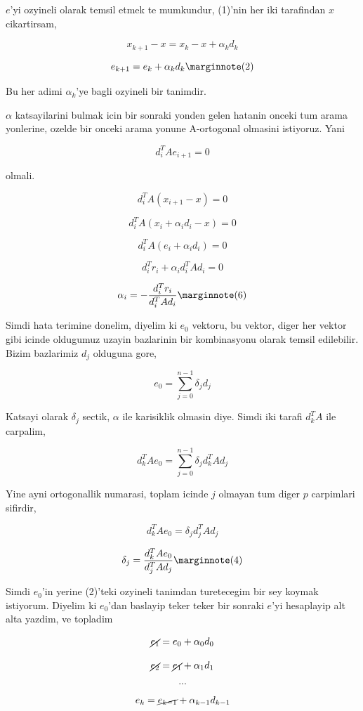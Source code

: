 \documentclass[12pt,fleqn]{article}\usepackage{../common}
\begin{document}
$e$'yi ozyineli olarak temsil etmek te mumkundur, (1)'nin her iki
tarafindan $x$ cikartirsam, 

\[ x_{k+1} - x = x_k - x + \alpha_k d_{k} \]

\[ e_{k+1} = e_k + \alpha_k d_k 
\mlabel{2}
\]

Bu her adimi $\alpha_k$'ye bagli ozyineli bir tanimdir. 

$\alpha$ katsayilarini bulmak icin bir sonraki yonden gelen hatanin onceki
tum arama yonlerine, ozelde bir onceki arama yonune A-ortogonal
olmasini istiyoruz. Yani

\[ d_i^TA e_{i+1}  = 0\]

olmali. 

\[ d_i^TA (x_{i+1}-x)  = 0\]

\[ d_i^TA (x_{i} + \alpha_i d_i -x)  = 0\]

\[ d_i^TA (e_i + \alpha_i d_i )  = 0\]

\[ d_i^Tr_i + \alpha_i d_i^TA d_i   = 0\]

\[ \alpha_i = -\frac{ d_i^Tr_i}{d_i^T A d_i} \mlabel{6}
\]

Simdi hata terimine donelim, diyelim ki $e_0$ vektoru, bu vektor, diger
her vektor gibi icinde oldugumuz uzayin bazlarinin bir kombinasyonu olarak
temsil edilebilir. Bizim bazlarimiz $d_j$ olduguna gore, 

\[ e_0 = \sum _{ j=0}^{n-1} \delta_j d_j \]

Katsayi olarak $\delta_j$ sectik, $\alpha$ ile karisiklik olmasin
diye. Simdi iki tarafi $d_k^T A$ ile carpalim, 

\[ d_k^T A e_0 = \sum _{ j=0}^{n-1} \delta_j d_k^T A d_j \]

Yine ayni ortogonallik numarasi, toplam icinde $j$ olmayan tum diger $p$
carpimlari sifirdir, 

\[ d_k^T A e_0 =  \delta_j d_j^T A d_j \]

\[ \delta_j = \frac{ d_k^T A e_0}{ d_j^T A d_j } 
\mlabel{4}
\]

Simdi $e_0$'in yerine (2)'teki ozyineli tanimdan turetecegim bir sey koymak
istiyorum. Diyelim ki $e_0$'dan baslayip teker teker bir sonraki $e$'yi
hesaplayip alt alta yazdim, ve topladim

\[ \cancel{e_{1}} = e_0 + \alpha_0 d_0\]

\[ \cancel{e_{2}} = \cancel{e_1} + \alpha_1 d_1\]

\[ ... \]

\[ e_{k} = \cancel{e_{k-1}} + \alpha_{k-1} d_{k-1}\]
\end{document}
